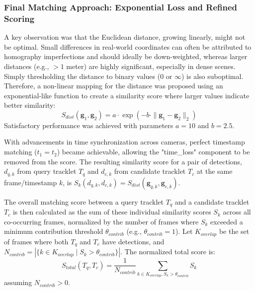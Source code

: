 \documentclass[12pt, a4paper]{article}
\begin{document}
\subsubsection{Final Matching Approach: Exponential Loss and Refined Scoring}
A key observation was that the Euclidean distance, growing linearly, might not be optimal. Small differences in real-world coordinates can often be attributed to homography imperfections and should ideally be down-weighted, whereas larger distances (e.g., $>1$ meter) are highly significant, especially in dense scenes. Simply thresholding the distance to binary values (0 or $\infty$) is also suboptimal. Therefore, a non-linear mapping for the distance was proposed using an exponential-like function to create a similarity score where larger values indicate better similarity:
$$ S_{dist}(\mathbf{g}_1, \mathbf{g}_2) = a \cdot \exp(-b \cdot \| \mathbf{g}_1 - \mathbf{g}_2 \|_2) $$
Satisfactory performance was achieved with parameters $a = 10$ and $b = 2.5$.

With advancements in time synchronization across cameras, perfect timestamp matching ($t_1 = t_2$) became achievable, allowing the "time\_loss" component to be removed from the score. The resulting similarity score for a pair of detections, $d_{q,k}$ from query tracklet $T_q$ and $d_{c,k}$ from candidate tracklet $T_c$ at the same frame/timestamp $k$, is $S_{k}(d_{q,k}, d_{c,k}) = S_{dist}(\mathbf{g}_{q,k}, \mathbf{g}_{c,k}).$


The overall matching score between a query tracklet $T_q$ and a candidate tracklet $T_c$ is then calculated as the sum of these individual similarity scores $S_k$ across all co-occurring frames, normalized by the number of frames where $S_k$ exceeded a minimum contribution threshold $\theta_{contrib}$ (e.g., $\theta_{contrib} = 1$). Let $K_{overlap}$ be the set of frames where both $T_q$ and $T_c$ have detections, and $N_{contrib} = |\{k \in K_{overlap} \mid S_k > \theta_{contrib}\}|$. The normalized total score is:
$$ S_{total}(T_q, T_c) = \frac{1}{N_{contrib}} \sum_{k \in K_{overlap}, S_k > \theta_{contrib}} S_k $$
assuming $N_{contrib} > 0$.
\end{document}
